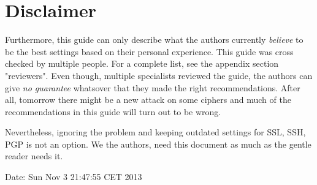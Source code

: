 \section{Disclaimer}
Furthermore, this guide can only describe what the authors currently \emph{believe} to be the best settings based on their personal experience. This guide was cross checked by multiple people. For a complete list, see the appendix section "reviewers". Even though, multiple specialists reviewed the guide, the authors can give \emph{no guarantee} whatsover that they made the right recommendations. After all, tomorrow there might be a new attack on some ciphers and much of the recommendations in this guide will turn out to be wrong.


Nevertheless, ignoring the problem and keeping outdated settings for SSL, SSH, PGP is not an option. We the authors, need this document as much as the gentle reader needs it.

Date: Sun Nov  3 21:47:55 CET 2013

